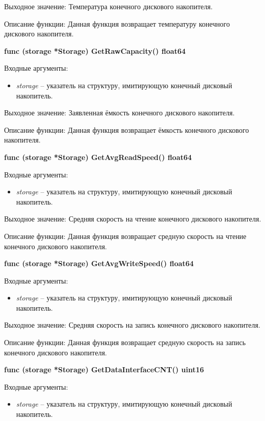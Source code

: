 Выходное значение: Температура конечного дискового накопителя.

Описание функции: Данная функция возвращает температуру конечного дискового накопителя.

\textbf{func (storage *Storage) GetRawCapacity() float64}

Входные аргументы: 
\begin{itemize}
	\item \textit{storage} -- указатель на структуру, имитирующую конечный дисковый накопитель.
\end{itemize}

Выходное значение: Заявленная ёмкость конечного дискового накопителя.

Описание функции: Данная функция возвращает ёмкость конечного дискового накопителя.

\textbf{func (storage *Storage) GetAvgReadSpeed() float64}

Входные аргументы: 
\begin{itemize}
	\item \textit{storage} -- указатель на структуру, имитирующую конечный дисковый накопитель.
\end{itemize}

Выходное значение: Средняя скорость на чтение конечного дискового накопителя.

Описание функции: Данная функция возвращает средную скорость на чтение конечного дискового накопителя.

\textbf{func (storage *Storage) GetAvgWriteSpeed() float64}

Входные аргументы: 
\begin{itemize}
	\item \textit{storage} -- указатель на структуру, имитирующую конечный дисковый накопитель.
\end{itemize}

Выходное значение: Средняя скорость на запись конечного дискового накопителя.

Описание функции: Данная функция возвращает средную скорость на запись конечного дискового накопителя.


\textbf{func (storage *Storage) GetDataInterfaceCNT() uint16}

Входные аргументы: 
\begin{itemize}
	\item \textit{storage} -- указатель на структуру, имитирующую конечный дисковый накопитель.
\end{itemize}

